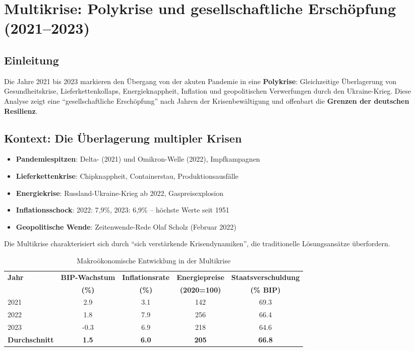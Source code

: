 \chapter{Multikrise: Polykrise und gesellschaftliche Erschöpfung (2021–2023)}
\label{chap:multikrise}

\section*{Einleitung}
Die Jahre 2021 bis 2023 markieren den Übergang von der akuten Pandemie in eine \textbf{Polykrise}: Gleichzeitige Überlagerung von Gesundheitskrise, Lieferkettenkollaps, Energieknappheit, Inflation und geopolitischen Verwerfungen durch den Ukraine-Krieg. Diese Analyse zeigt eine \enquote{gesellschaftliche Erschöpfung} nach Jahren der Krisenbewältigung und offenbart die \textbf{Grenzen der deutschen Resilienz}.

\section{Kontext: Die Überlagerung multipler Krisen}

\begin{itemize}
    \item \textbf{Pandemiespitzen}: Delta- (2021) und Omikron-Welle (2022), Impfkampagnen
    \item \textbf{Lieferkettenkrise}: Chipknappheit, Containerstau, Produktionsausfälle
    \item \textbf{Energiekrise}: Russland-Ukraine-Krieg ab 2022, Gaspreisexplosion
    \item \textbf{Inflationsschock}: 2022: 7,9\%, 2023: 6,9\% – höchste Werte seit 1951
    \item \textbf{Geopolitische Wende}: Zeitenwende-Rede Olaf Scholz (Februar 2022)
\end{itemize}

Die Multikrise charakterisiert sich durch \enquote{sich verstärkende Krisendynamiken}, die traditionelle Lösungsansätze überfordern.

\begin{table}[ht]
    \centering
    \caption{Makroökonomische Entwicklung in der Multikrise}
    \label{tab:makro_multikrise}
    \begin{tabular}{lcccc}
        \toprule
        \textbf{Jahr} & \textbf{BIP-Wachstum} & \textbf{Inflationsrate} & \textbf{Energiepreise} & \textbf{Staatsverschuldung} \\
        & \textbf{(\%)} & \textbf{(\%)} & \textbf{(2020=100)} & \textbf{(\% BIP)} \\
        \midrule
        2021 & 2.9 & 3.1 & 142 & 69.3 \\
        2022 & 1.8 & 7.9 & 256 & 66.4 \\
        2023 & -0.3 & 6.9 & 218 & 64.6 \\
        \midrule
        \textbf{Durchschnitt} & \textbf{1.5} & \textbf{6.0} & \textbf{205} & \textbf{66.8} \\
        \bottomrule
    \end{tabular}
\end{table}

